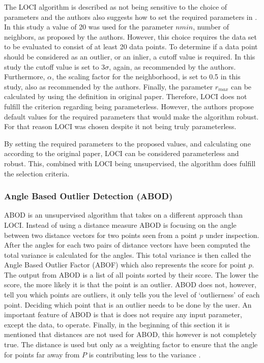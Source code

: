 The LOCI algorithm is described as not being sensitive to the choice of parameters and the authors also suggests how to set the required parameters in \citep{papadimitriou2003loci}. In this study a value of 20 was used for the parameter $nmin$, number of neighbors, as proposed by the authors. However, this choice requires the data set to be evaluated to consist of at least 20 data points. To determine if a data point should be considered as an outlier, or an inlier, a cutoff value is required. In this study the cutoff value is set to $3\sigma$, again, as recommended by the authors. Furthermore, $\alpha$, the scaling factor for the neighborhood, is set to 0.5 in this study, also as recommended by the authors. Finally, the parameter $r_{max}$ can be calculated by using the definition in original paper. Therefore, LOCI does not fulfill the criterion regarding being parameterless. However, the authors propose default values for the required parameters that would make the algorithm robust. For that reason LOCI was chosen despite it not being truly parameterless. 


By setting the required parameters to the proposed values, and calculating one according to the original paper, LOCI can be considered parameterless and robust. This, combined with LOCI being unsupervised, the algorithm does fulfill the selection criteria.




\subsubsection{Angle Based Outlier Detection (ABOD)}
ABOD is an unsupervised algorithm that takes on a different approach than LOCI\@. Instead of using a distance measure ABOD is focusing on the angle between two distance vectors for two points seen from a point $p$ under inspection. After the angles for each two pairs of distance vectors have been computed the total variance is calculated for the angles. This total variance is then called the Angle Based Outlier Factor (ABOF) which also represents the score for point $p$. The output from ABOD is a list of all points sorted by their score. The lower the score, the more likely it is that the point is an outlier. ABOD does not, however, tell you which points are outliers, it only tells you the level of `outlierness' of each point. Deciding which point that is an outlier needs to be done by the user. An important feature of ABOD is that is does not require any input parameter, except the data, to operate. Finally, in the beginning of this section it is mentioned that distances are not used for ABOD, this however is not completely true. The distance is used but only as a weighting factor to ensure that the angle for points far away from $P$ is contributing less to the variance \citep{kriegel2008angle}.


